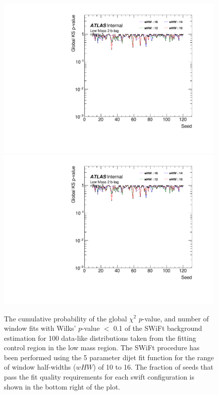 \begin{figure}[!htb]
\captionsetup[subfigure]{aboveskip=0pt,justification=centering}
\centering
{} {
  \includegraphics[width=0.49\linewidth, angle=0,page=7]{figs/Dibjet/LowMass/FitStudy_min566/windowSel_corrFitCR_dataLike_5para.pdf}
}  \hspace{-8mm}
 {
  \includegraphics[width=0.49\linewidth, angle=0,page=9]{figs/Dibjet/LowMass/FitStudy_min566/windowSel_corrFitCR_dataLike_5para.pdf}
}
\vspace{10pt}
\caption{\label{fig:windowSel_dataLike}
  The cumulative probability of the global $\chi^{2}$ \mbox{$p$-value}, %
  and number of window fits with Wilks' \mbox{$p$-value} $<$ 0.1 of the SWiFt background estimation for
  100 data-like distributions taken from the fitting control region in the low mass region.
  The SWiFt procedure has been performed using the 5 parameter dijet fit function
  for the range of window half-widths ($wHW$) of 10 to 16.
  The fraction of seeds that pass the fit quality requirements for each swift configuration is shown in the bottom right of the plot.
}
\end{figure}

